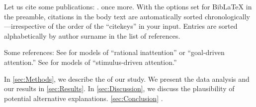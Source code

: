 Let us cite some publications: \cite{Andersen2008, Andreoni2012, Balakrishnan2016, Lisi1995}. \cite{Andersen2008} once more. With the options set for BibLaTeX in the preamble, citations in the body text are automatically sorted chronologically---irrespective of the order of the ``citekeys'' in your input. Entries are sorted alphabetically by author surname in the list of references.

\Blindtext[3]

Some references: See \cite{Sims2003, Gabaix2014} for models of ``rational inattention'' or ``goal-driven attention.'' See \cite{Bordalo2012, Bordalo2013, Koszegi2013, Taubinsky2014, Bushong2016} for models of ``stimulus-driven attention.''%

\blindmathtrue

\Blindtext[3]

In \autoref{sec:Methods}, we describe the  of our study. We present the data analysis and our results in \autoref{sec:Results}. In \autoref{sec:Discussion}, we discuss the plausibility of potential alternative explanations. \autoref{sec:Conclusion} .